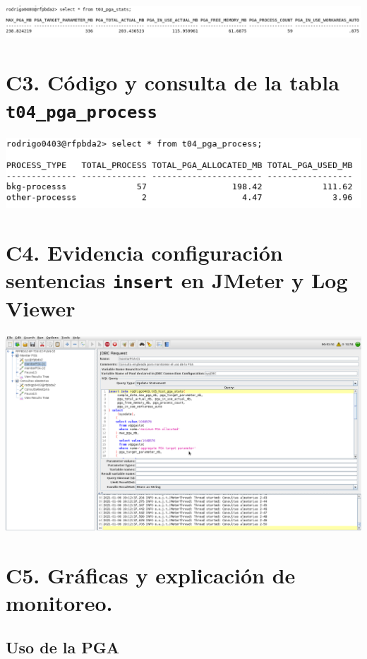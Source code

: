 \documentclass{article}
\begin{document}


\includegraphics[width=\linewidth]{c2}

\section*{C3. Código y consulta de la tabla \texttt{t04\_pga\_process}}



\includegraphics[width=0.6\linewidth]{c3}

\section*{C4. Evidencia configuración sentencias \texttt{insert} en JMeter y 
Log Viewer}

\includegraphics[width=\linewidth]{c4}

\section*{C5. Gráficas y explicación de monitoreo.}

\subsection*{Uso de la PGA}
\end{document}
